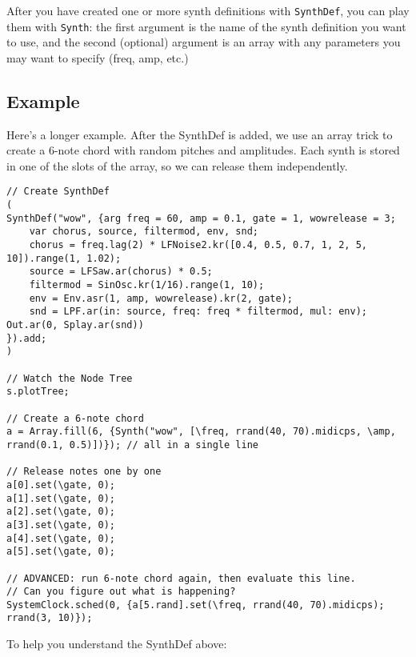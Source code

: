 After you have created one or more synth definitions with \texttt{SynthDef}, you can play them with \texttt{Synth}: the first argument is the name of the synth definition you want to use, and the second (optional) argument is an array with any parameters you may want to specify (freq, amp, etc.)

\subsection{Example}

Here's a longer example. After the SynthDef is added, we use an array trick to create a 6-note chord with random pitches and amplitudes. Each synth is stored in one of the slots of the array, so we can release them independently.

 
\begin{lstlisting}[style=SuperCollider-IDE, basicstyle=\scttfamily\footnotesize]
// Create SynthDef
(
SynthDef("wow", {arg freq = 60, amp = 0.1, gate = 1, wowrelease = 3;
	var chorus, source, filtermod, env, snd;
	chorus = freq.lag(2) * LFNoise2.kr([0.4, 0.5, 0.7, 1, 2, 5, 10]).range(1, 1.02);
	source = LFSaw.ar(chorus) * 0.5;
	filtermod = SinOsc.kr(1/16).range(1, 10);
	env = Env.asr(1, amp, wowrelease).kr(2, gate);
	snd = LPF.ar(in: source, freq: freq * filtermod, mul: env);
Out.ar(0, Splay.ar(snd))
}).add;
)

// Watch the Node Tree
s.plotTree;

// Create a 6-note chord
a = Array.fill(6, {Synth("wow", [\freq, rrand(40, 70).midicps, \amp, rrand(0.1, 0.5)])}); // all in a single line

// Release notes one by one
a[0].set(\gate, 0);
a[1].set(\gate, 0);
a[2].set(\gate, 0);
a[3].set(\gate, 0);
a[4].set(\gate, 0);
a[5].set(\gate, 0);

// ADVANCED: run 6-note chord again, then evaluate this line.
// Can you figure out what is happening?
SystemClock.sched(0, {a[5.rand].set(\freq, rrand(40, 70).midicps); rrand(3, 10)});
\end{lstlisting}

To help you understand the SynthDef above:

